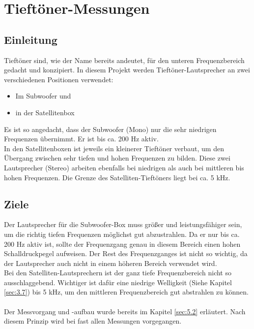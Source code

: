 \section{Tieftöner-Messungen} \label{sec:5.3}
\subsection{Einleitung} \label{subsec:5.3.1}
Tieftöner sind, wie der Name bereits andeutet, für den unteren Frequenzbereich gedacht und konzipiert.
In diesem Projekt werden Tieftöner-Lautsprecher an zwei verschiedenen Positionen verwendet:
\begin{itemize}
	\item Im Subwoofer und 
	\item in der Satellitenbox
\end{itemize}
Es ist so angedacht, dass der Subwoofer (Mono) nur die sehr niedrigen Frequenzen übernimmt.
Er ist bis ca. 200 Hz aktiv.\\
In den Satellitenboxen ist jeweils ein kleinerer Tieftöner verbaut, um den Übergang zwischen sehr tiefen und hohen Frequenzen zu bilden.
Diese zwei Lautsprecher (Stereo) arbeiten ebenfalls bei niedrigen als auch bei mittleren bis hohen Frequenzen.
Die Grenze des Satelliten-Tieftöners liegt bei ca. 5 kHz.

\subsection{Ziele} \label{subsec:5.3.2}
Der Lautsprecher für die Subwoofer-Box muss größer und leistungsfähiger sein, um die richtig tiefen Frequenzen möglichst gut abzustrahlen.
Da er nur bis ca. 200 Hz aktiv ist, sollte der Frequenzgang genau in diesem Bereich einen hohen Schalldruckpegel aufweisen.
Der Rest des Frequenzganges ist nicht so wichtig, da der Lautsprecher auch nicht in einem höheren Bereich verwendet wird. \\
Bei den Satelliten-Lautsprechern ist der ganz tiefe Frequenzbereich nicht so ausschlaggebend.
Wichtiger ist dafür eine niedrige Welligkeit (Siehe Kapitel \ref{sec:3.7}) bis 5 kHz, um den mittleren Frequenzbereich gut abstrahlen zu können.\\ \\
Der Messvorgang und -aufbau wurde bereits im Kapitel \ref{sec:5.2} erläutert.
Nach diesem Prinzip wird bei fast allen Messungen vorgegangen.

\newpage
